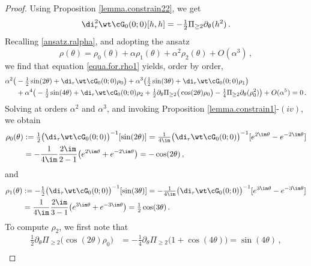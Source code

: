 \documentclass[a4paper,reqno,10pt]{article}
\newcommand{\pa}{\partial}
\begin{document}
\begin{proof}
     Using Proposition \ref{lemma.constrain22}, we get
    	\begin{equation}
    	\di_{r}^2\wt\cG_{0}(0;0) [h,h] = - \tfrac12 \Pi_{\geq 2} \pa_{\theta}(h^2) \,.
    	\end{equation}
    Recalling \eqref{ansatz.ralpha}, and adopting the ansatz
    \begin{equation}\label{ansatz.rho}
    	\rho(\theta) = \rho_{0}(\theta) + \alpha \rho_{1}(\theta) + \alpha^2 \rho_{2}(\theta) + O(\alpha^3)\,,
    \end{equation}
    we find that equation  \eqref{equa.for.rho1} yields, order by order, 
    	\begin{align}
    		\alpha^2\big( &-\tfrac12 \sin(2\theta) + \di_{r}\wt\cG_{0}(0;0) \rho_{0} \big) + \alpha^3 \big( \tfrac12 \sin(3\theta) + \di_{r}\wt\cG_{0}(0;0) \rho_{1} \big) \\
    		& + \alpha^4 \big( -\tfrac12 \sin(4\theta) + \di_{r}\wt\cG_{0}(0;0) \rho_{2} +{ \tfrac12 \pa_{\theta}\Pi_{\geq 2}\big(\cos(2\theta)\rho_{0}\big) }  - \tfrac14 \Pi_{\geq 2} \pa_{\theta} (\rho_{0}^2) \big) + O(\alpha^5) = 0\,.
    	\end{align}
    Solving at orders $\alpha^2$ and $\alpha^3$, and invoking Proposition \ref{lemma.constrain1}-$(iv)$, we  obtain 
    	\begin{align}
    		\rho_{0}(\theta) &:=  \tfrac12 \big( \di_{r}\wt\cG_{0}(0;0) \big)^{-1} [\sin(2\theta)]     	= \tfrac{1}{4\im}  \big( \di_{r}\wt\cG_{0}(0;0) \big)^{-1}[e^{2\im\theta}-e^{-2\im\theta}]\nonumber \\ 
    		& = - \frac{1}{4\im} \frac{2\im}{2-1} \big( e^{2\im\theta} + e^{-2\im\theta} \big) = - \cos(2\theta) \,, \label{rho0.2theta} 
            \end{align}
            and
            \begin{align}
    			\rho_{1}(\theta) &:= - \tfrac12 \big( \di_{r}\wt\cG_{0}(0;0) \big)^{-1} [\sin(3\theta)]     	= -\tfrac{1}{4\im}  \big( \di_{r}\wt\cG_{0}(0;0) \big)^{-1}[e^{3\im\theta}-e^{-3\im\theta}] \nonumber \\
    		& = \frac{1}{4\im} \frac{2\im}{3-1} \big( e^{3\im\theta} + e^{-3\im\theta} \big) =\tfrac12 \cos(3\theta) \,.\label{rho1.3theta}
    	\end{align}
    To compute $\rho_{2}$, we first note that
    \begin{align}
    { \tfrac12 \pa_{\theta}\Pi_{\geq 2}\big(\cos(2\theta)\rho_{0}\big) } & = {- \tfrac14 \pa_{\theta}\Pi_{\geq 2}\big( 1+ \cos(4\theta) \big)  = \sin(4\theta)} \,, \\

\end{align}
\end{proof}
\end{document}
